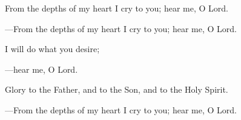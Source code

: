 \responsory
\begin{hangpar}

From the depths of my heart I cry to you; hear me, O Lord.

{\color{red}---\thinspace}From the depths of my heart I cry to you; hear me, O Lord.

\medskip I will do what you desire;

{\color{red}---\thinspace}hear me, O Lord.

\medskip Glory to the Father, and to the Son, and to the Holy Spirit.

{\color{red}---\thinspace}From the depths of my heart I cry to you; hear me, O Lord.
\end{hangpar}
